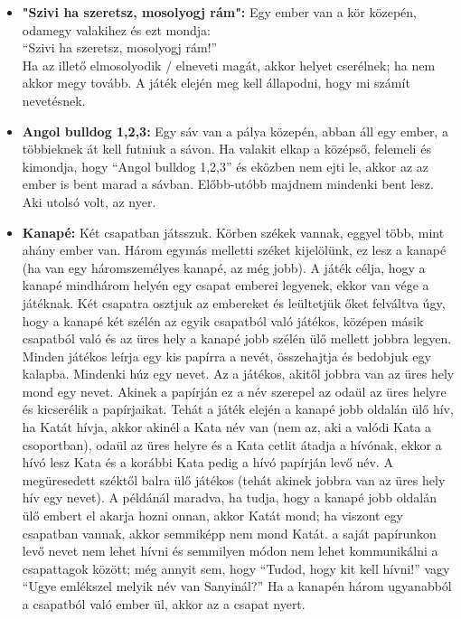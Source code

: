 \documentclass[a4paper, 12pt, twoside, openright]{article}
\begin{document}
\begin{itemize}
\item \textbf{"Szivi ha szeretsz, mosolyogj rám":} Egy ember van a kör közepén, odamegy valakihez és ezt mondja:\\
``Szivi ha szeretsz, mosolyogj rám!''\\
Ha az illető elmosolyodik / elneveti magát, akkor helyet cserélnek; ha nem akkor megy tovább. A játék elején meg kell állapodni, hogy mi számít nevetésnek.

\item \textbf{Angol bulldog 1,2,3:} Egy sáv van a pálya közepén, abban áll egy ember, a többieknek át kell futniuk a sávon. Ha valakit elkap a középső, felemeli és kimondja, hogy ``Angol bulldog 1,2,3'' és eközben nem ejti le, akkor az az ember is bent marad a sávban. Előbb-utóbb majdnem mindenki bent lesz. Aki utolsó volt, az nyer.

\item \textbf{Kanapé:} Két csapatban játsszuk. Körben székek vannak, eggyel több, mint ahány ember van. Három egymás melletti széket kijelölünk, ez lesz a kanapé (ha van egy háromszemélyes kanapé, az még jobb). A játék célja, hogy a kanapé mindhárom helyén egy csapat emberei legyenek, ekkor van vége a játéknak. Két csapatra osztjuk az embereket és leültetjük őket felváltva úgy, hogy a kanapé két szélén az egyik csapatból való játékos, középen másik csapatból való és az üres hely a kanapé jobb szélén ülő mellett jobbra legyen. Minden játékos leírja egy kis papírra a nevét, összehajtja és bedobjuk egy kalapba. Mindenki húz egy nevet. Az a játékos, akitől jobbra van az üres hely mond egy nevet. Akinek a papírján ez a név szerepel az odaül az üres helyre és kicserélik a papírjaikat. Tehát a játék elején a kanapé jobb oldalán ülő hív, ha Katát hívja, akkor akinél a Kata név van (nem az, aki a valódi Kata a csoportban), odaül az üres helyre és a Kata cetlit átadja a hívónak, ekkor a hívó lesz Kata és a korábbi Kata pedig a hívó papírján levő név. A megüresedett széktől balra ülő játékos (tehát akinek jobbra van az üres hely hív egy nevet). A példánál maradva, ha tudja, hogy a kanapé jobb oldalán ülő embert el akarja hozni onnan, akkor Katát mond; ha viszont egy csapatban vannak, akkor semmiképp nem mond Katát. a saját papírunkon levő nevet nem lehet hívni és semmilyen módon nem lehet kommunikálni a csapattagok között; még annyit sem, hogy ``Tudod, hogy kit kell hívni!'' vagy ``Ugye emlékszel melyik név van Sanyinál?'' Ha a kanapén három ugyanabból a csapatból való ember ül, akkor az a csapat nyert.


\end{itemize}
\end{document}
